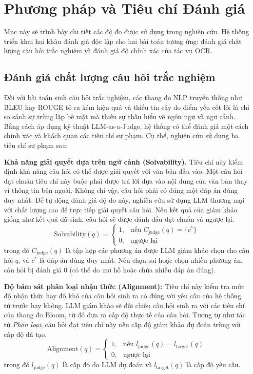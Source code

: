 \section{Phương pháp và Tiêu chí Đánh giá}

Mục này sẽ trình bày chi tiết các độ đo được sử dụng trong nghiên cứu. Hệ thống triển khai hai khâu đánh giá độc lập cho hai bài toán tương ứng: đánh giá chất lượng câu hỏi trắc nghiệm và đánh giá độ chính xác của tác vụ OCR.

\subsection{Đánh giá chất lượng câu hỏi trắc nghiệm}

Đối với bài toán sinh câu hỏi trắc nghiệm, các thang đo NLP truyền thống như BLEU hay ROUGE tỏ ra kém hiệu quả và thiếu tin cậy do điểm yếu cốt lõi là chỉ so sánh sự trùng lặp bề mặt mà thiếu sự thấu hiểu về ngôn ngữ và ngữ cảnh. Bằng cách áp dụng kỹ thuật LLM-as-a-Judge, hệ thống có thể đánh giá một cách chính xác và khách quan các tiêu chí sư phạm. Cụ thể, nghiên cứu sử dụng ba tiêu chí sư phạm sau:

\textbf{Khả năng giải quyết dựa trên ngữ cảnh (Solvability).} Tiêu chí này kiểm định khả năng câu hỏi có thể được giải quyết với văn bản đầu vào. Một câu hỏi đạt chuẩn tiêu chí này buộc phải được trả lời dựa vào nội dung của văn bản thay vì thông tin bên ngoài. Không chỉ vậy, câu hỏi phải có đúng một đáp án đúng duy nhất. Để tự động đánh giá độ đo này, nghiên cứu sử dụng LLM thương mại với chất lượng cao để trực tiếp giải quyết câu hỏi. Nếu kết quả của giám khảo giống như kết quả đã sinh, câu hỏi sẽ được đánh dấu đạt chuẩn và ngược lại.
$$\text{Solvability}(q) = \begin{cases} 1, & \text{nếu } C_{\text{judge}}(q) = \{c^*\} \\ 0, & \text{ngược lại} \end{cases}$$
trong đó $C_{\text{judge}}(q)$ là tập hợp các phương án được LLM giám khảo chọn cho câu hỏi $q$, và $c^*$ là đáp án đúng duy nhất. Nếu chọn sai hoặc chọn nhiều phương án, câu hỏi bị đánh giá 0 (có thể do mơ hồ hoặc chứa nhiều đáp án đúng).

\textbf{Độ bám sát phân loại nhận thức (Alignment):} Tiêu chí này kiểm tra mức độ nhận thức hay độ khó của câu hỏi sinh ra có đúng với yêu cầu của hệ thống từ trước hay không. LLM giám khảo sẽ đối chiếu câu hỏi sinh ra với các tiêu chí của thang đo Bloom, từ đó đưa ra cấp độ thực tế của câu hỏi. Tương tự như tác tử \textit{Phân loại}, câu hỏi đạt tiêu chí này nếu cấp độ giám khảo dự đoán trùng với cấp độ đã tạo.
$$\text{Alignment}(q) = \begin{cases} 1, & \text{nếu } l_{\text{judge}}(q) = l_{\text{target}}(q) \\ 0, & \text{ngược lại} \end{cases}$$
trong đó $l_{\text{judge}}(q)$ là cấp độ do LLM dự đoán và $l_{\text{target}}(q)$ là cấp độ yêu cầu.

